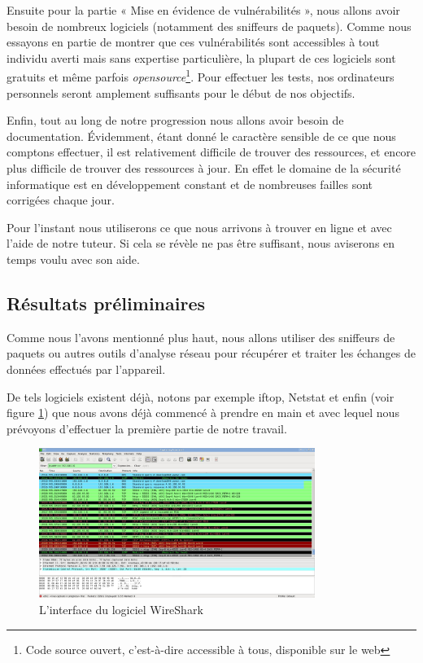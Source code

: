 \documentclass[a4paper, 12pt,twoside]{article}
\begin{document}
		Ensuite pour la partie «  Mise en évidence de vulnérabilités  », nous allons avoir besoin de nombreux logiciels (notamment des sniffeurs de paquets). Comme nous essayons en partie de montrer que ces vulnérabilités sont accessibles à tout individu averti mais sans expertise particulière, la plupart de ces logiciels sont gratuits et même parfois \emph{opensource}\footnote{Code source ouvert,  c'est-à-dire accessible à tous, disponible sur le web}. Pour effectuer les tests, nos ordinateurs personnels seront amplement suffisants pour le début de nos objectifs.
		
		Enfin, tout au long de notre progression nous allons avoir besoin de documentation. Évidemment, étant donné le caractère sensible de ce que nous comptons effectuer, il est relativement difficile de trouver des ressources, et encore plus difficile de trouver des ressources à jour. En effet le domaine de la sécurité informatique est en développement constant et de nombreuses failles sont corrigées chaque jour.

		Pour l'instant nous utiliserons ce que nous arrivons à trouver en ligne et avec l'aide de notre tuteur. Si cela se révèle ne pas être suffisant, nous aviserons en temps voulu avec son aide.

		\subsection{Résultats préliminaires}

		Comme nous l'avons mentionné plus haut, nous allons utiliser des sniffeurs de paquets ou autres outils d'analyse réseau pour récupérer et traiter les échanges de données effectués par l'appareil.
		
		De tels logiciels existent déjà, notons par exemple iftop, Netstat et enfin \wireshark{} (voir figure \ref{pic:wireshark}) que nous avons déjà commencé à prendre en main et avec lequel nous prévoyons d'effectuer la première partie de notre travail.
		
		\begin{figure}[!ht]
		\centering
		\includegraphics[width=0.8\textwidth]{wireshark.jpg}
		\caption{L'interface du logiciel WireShark}
		\label{pic:wireshark}
		\end{figure}
		
\end{document}
